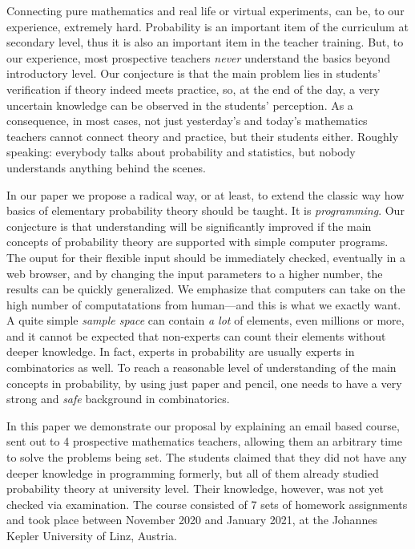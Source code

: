 \documentclass[]{interact}
\theoremstyle{plain}%
\theoremstyle{definition}
\theoremstyle{remark}
\begin{document}
Connecting pure mathematics and real life or virtual experiments, can be, to our experience,
extremely hard. Probability is an important item of the curriculum at secondary level,
thus it is also an important item in the teacher training. But, to our experience,
most prospective teachers \textit{never} understand the basics beyond introductory level.
Our conjecture is that the main problem lies in students' verification if theory indeed meets practice,
so, at the end of the day, a very uncertain knowledge can be observed in the students' perception. As a consequence,
in most cases, not just yesterday's and today's mathematics teachers cannot connect
theory and practice, but their students either. Roughly speaking: everybody talks about probability and
statistics, but nobody understands anything behind the scenes.

In our paper we propose a radical way, or at least, to extend the classic way how
basics of elementary probability theory should be taught. It is \textit{programming}.
Our conjecture is that understanding will be significantly improved if the main concepts
of probability theory are supported with simple computer programs. The ouput for their flexible input
should be immediately checked, eventually in a web browser, and by changing the input parameters
to a higher number, the results can be quickly generalized. We emphasize that computers
can take on the high number of computatations from human---and this is what we exactly want.
A quite simple \textit{sample space} can contain \textit{a lot} of elements, even millions or more, and it cannot
be expected that non-experts can count their elements without deeper knowledge. In fact,
experts in probability are usually experts in combinatorics as well. To reach a reasonable
level of understanding of the main concepts in probability, by using just paper and pencil,
one needs to have a very strong and \textit{safe} background in combinatorics.

In this paper we demonstrate our proposal by explaining an email based course, sent out
to 4 prospective mathematics teachers, allowing them an arbitrary time to solve the problems being set.
The students claimed that they did not have any deeper knowledge in programming formerly, but all of
them already studied probability theory at university level. Their knowledge, however, was
not yet checked via examination. The course consisted of 7 sets of homework assignments
and took place between November 2020 and January 2021, at the Johannes Kepler University of Linz, Austria.
\end{document}

